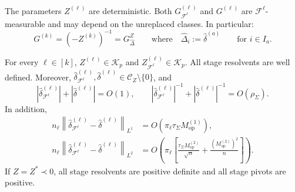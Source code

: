 \documentclass[EJP, preprint, NODS, nobera, nofontexpansion]{ejpecp}
\DeclareMathOperator{\op}{op}
\begin{document}
The parameters \(Z^{(\ell)}\) are deterministic.
Both \(G_{\mathcal F^{\ell}}^{(\ell)}\) and \(G^{(\ell)}\) are
\(\mathcal F^{\ell}\)-measurable and may depend on the unreplaced classes.
In particular: 
\[
    G^{(k)}=(-Z^{(k)})^{-1}=G_{\widehat\Delta}^Z
    \qquad \text{where}\quad \widehat\Delta_i:=\widehat\delta^{(a)}
    \qquad\text{for }i\in I_a.
\]


\begin{lemma}
\label{lem:class_average_pivot_estimates}
For every \(\ell\in[k]\), \(Z^{(\ell)}\in \mathcal K_p\) and
\(Z_{\mathcal F^{\ell}}^{(\ell)}\in \mathcal K_p\).
All stage resolvents are well defined. Moreover, $\widehat\delta_{\mathcal F^{\ell}}^{(\ell)},
    \widehat\delta^{(\ell)}
    \in\mathcal C_Z\setminus\{0\}$, and
\[
    \left|
        \widehat\delta_{\mathcal F^{\ell}}^{(\ell)}
    \right|
    +
    \left|
        \widehat\delta^{(\ell)}
    \right|
    =
    O(1),
    \qquad
    \left|
        \widehat\delta_{\mathcal F^{\ell}}^{(\ell)}
    \right|^{-1}
    +
    \left|
        \widehat\delta^{(\ell)}
    \right|^{-1}
    =
    O(\rho_\Sigma).
\]
In addition,
\begin{align}
\label{eq:class_pivot_first_moment}
    n_{\ell}
    \left\|
        \widehat\delta_{\mathcal F^{\ell}}^{(\ell)}
        -
        \widehat\delta^{(\ell)}
    \right\|_{L^1}
    &=
    O\!\left(
        \pi_{\ell}\tau_\Sigma M_{\op}^{(1)}
    \right),
    \\
\label{eq:class_pivot_second_moment}
    n_{\ell}
    \left\|
        \widehat\delta_{\mathcal F^{\ell}}^{(\ell)}
        -
        \widehat\delta^{(\ell)}
    \right\|_{L^2}
    &=
    O\!\left(
        \pi_{\ell}
        \left[
            \frac{\tau_\Sigma M_{\op}^{(2)}}{\sqrt n}
            +
            \frac{(M_{\op}^{(2)})^2}{n}
        \right]
    \right).
\end{align}
If \(Z=Z^*\prec0\), all stage resolvents are positive definite and all
stage pivots are positive.
\end{lemma}
\end{document}
